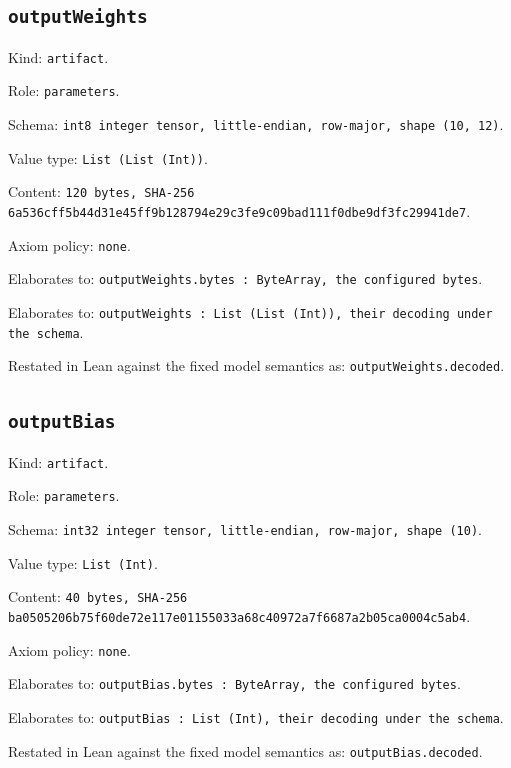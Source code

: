 \documentclass[11pt]{article}
\begin{document}
\subsection*{\texttt{outputWeights}}
\noindent Kind: \texttt{artifact}.\par
\noindent Role: \texttt{parameters}.\par
\noindent Schema: \texttt{int8 integer tensor, little-endian, row-major, shape (10, 12)}.\par
\noindent Value type: \texttt{List (List (Int))}.\par
\noindent Content: \texttt{120 bytes, SHA-256 6a536cff5b44d31e45ff9b128794e29c3fe9c09bad111f0dbe9df3fc29941de7}.\par
\noindent Axiom policy: \texttt{none}.\par
\noindent Elaborates to: \texttt{outputWeights.bytes : ByteArray, the configured bytes}.\par
\noindent Elaborates to: \texttt{outputWeights : List (List (Int)), their decoding under the schema}.\par
\noindent Restated in Lean against the fixed model semantics as: \texttt{outputWeights.decoded}.\par
\subsection*{\texttt{outputBias}}
\noindent Kind: \texttt{artifact}.\par
\noindent Role: \texttt{parameters}.\par
\noindent Schema: \texttt{int32 integer tensor, little-endian, row-major, shape (10)}.\par
\noindent Value type: \texttt{List (Int)}.\par
\noindent Content: \texttt{40 bytes, SHA-256 ba0505206b75f60de72e117e01155033a68c40972a7f6687a2b05ca0004c5ab4}.\par
\noindent Axiom policy: \texttt{none}.\par
\noindent Elaborates to: \texttt{outputBias.bytes : ByteArray, the configured bytes}.\par
\noindent Elaborates to: \texttt{outputBias : List (Int), their decoding under the schema}.\par
\noindent Restated in Lean against the fixed model semantics as: \texttt{outputBias.decoded}.\par
\end{document}
